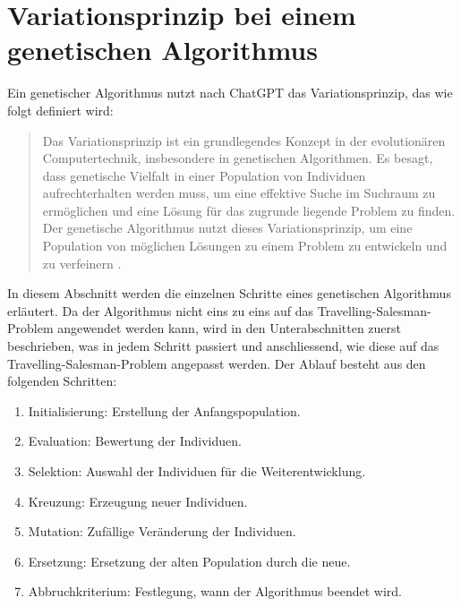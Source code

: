%
%
%
%
\section{Variationsprinzip bei einem genetischen Algorithmus
\label{buch:paper:varalg:section:genetic_algorithm_process}}
Ein genetischer Algorithmus nutzt nach ChatGPT das Variationsprinzip, 
das wie folgt definiert wird:
\begin{quote}
Das Variationsprinzip ist ein grundlegendes Konzept in der 
evolutionären Computertechnik, insbesondere in genetischen 
%
Algorithmen. Es besagt, dass genetische Vielfalt in einer 
Population von Individuen aufrechterhalten werden muss, 
um eine effektive Suche im Suchraum zu ermöglichen und eine 
Lösung für das zugrunde liegende Problem zu finden.
\\
Der genetische Algorithmus nutzt dieses Variationsprinzip, um eine 
Population von möglichen Lösungen zu einem Problem zu entwickeln 
und zu verfeinern \cite{varalg:chatgpt2024}.
\end{quote}
In diesem Abschnitt werden die einzelnen Schritte eines genetischen Algorithmus 
erläutert. Da der Algorithmus nicht eins zu eins auf das
Travelling-Salesman-Problem angewendet werden kann, wird in den
Unterabschnitten zuerst beschrieben,
was in jedem Schritt passiert und anschliessend, wie diese auf das
Travelling-Salesman-Problem angepasst werden.
Der Ablauf besteht aus den folgenden Schritten:
\begin{enumerate}
    \item Initialisierung: Erstellung der Anfangspopulation.
    \item Evaluation: Bewertung der Individuen.
    \item Selektion: Auswahl der Individuen für die Weiterentwicklung.
    \item Kreuzung: Erzeugung neuer Individuen.
    \item Mutation: Zufällige Veränderung der Individuen.
    \item Ersetzung: Ersetzung der alten Population durch die neue.
    \item Abbruchkriterium: Festlegung, wann der Algorithmus beendet wird.
\end{enumerate}








